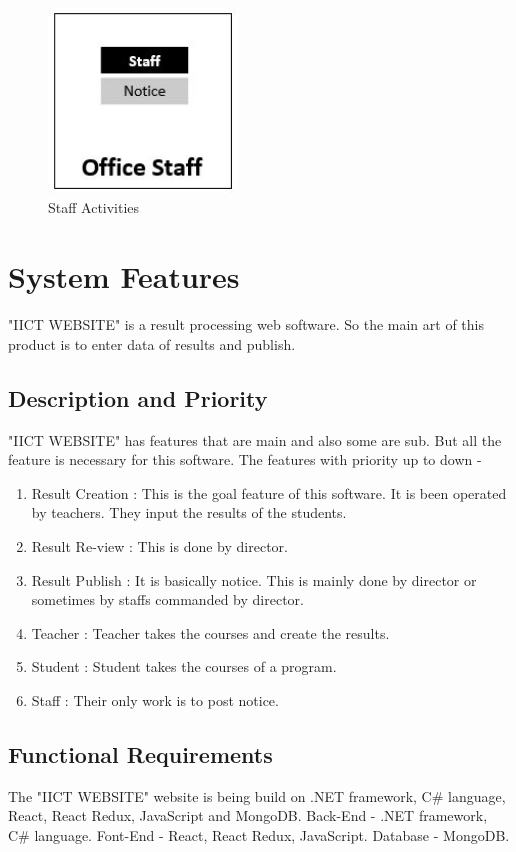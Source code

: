 \documentclass{scrreprt}
\begin{document}
	\begin{figure}[h!]
		\centering
		\includegraphics[width=5cm]{6.JPG}
		\caption{Staff Activities}
		\label{fig:Staff Activities}
	\end{figure}
	
	\chapter{System Features}
	"IICT WEBSITE" is a result processing web software. So the main art of this product is to enter data of results and publish. 
	
	\section{Description and Priority}
	"IICT WEBSITE" has features that are main and also some are sub. But all the feature is necessary for this software.
	\newline
	The features with priority up to down - 
	\begin{enumerate}
		\item Result Creation : This is the goal feature of this software. It is been operated by teachers. They input the results of the students.
		\item Result Re-view : This is done by director.
		\item Result Publish : It is basically notice. This is mainly done by director or sometimes by staffs commanded by director.
		\item Teacher : Teacher takes the courses and create the results.
		\item Student : Student takes the courses of a program.
		\item Staff : Their only work is to post notice.
	\end{enumerate}
	
	\section{Functional Requirements}
	The "IICT WEBSITE" website is being build on .NET framework, C\# language, React, React Redux, JavaScript and MongoDB.
	\newline
	Back-End - .NET framework, C\# language.
	\newline
	Font-End - React, React Redux, JavaScript.
	\newline
	Database -  MongoDB.
	
\end{document}
